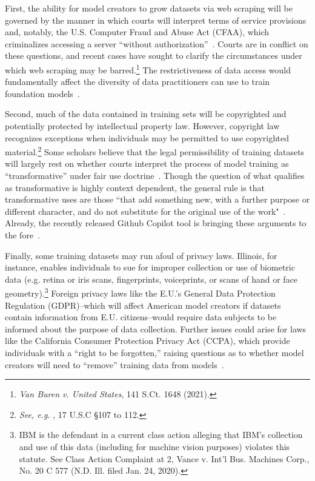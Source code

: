 First, the ability for model creators to grow datasets via web scraping will be governed by the manner in which courts will interpret terms of service provisions and, notably, the U.S.  Computer Fraud and Abuse Act (CFAA), which criminalizes accessing a server ``without authorization''~\citep{cfaa}. Courts are in conflict on these questions, and recent cases have sought to clarify the circumstances under which web scraping may be barred.\footnote{\textit{Van Buren v. United States}, 141 S.Ct. 1648 (2021).} The restrictiveness of data access would fundamentally affect the diversity of data practitioners can use to train foundation models~\citep{levendowski2018copyright}.

Second, much of the data contained in training sets will be copyrighted and potentially protected by intellectual property law. However, copyright law recognizes exceptions when individuals may be permitted to use copyrighted material.\footnote{\textit{See, e.g. }, 17 U.S.C \S 107 to 112.} Some scholars believe that the legal permissibility of training datasets will largely rest on whether courts interpret the process of model training as ``transformative'' under fair use doctrine~\citep{lemley2020fair}. Though the question of what qualifies as transformative is highly context dependent, the general rule is that transformative uses are those ``that add something new, with a further purpose or different character, and do not substitute for the original use of the work"~\citep{usco}. Already, the recently released Github Copilot tool is bringing these arguments to the fore~\citep{verge_copilot}. 

Finally, some training datasets may run afoul of privacy laws. Illinois, for instance, enables individuals to sue for improper collection or use of biometric data (e.g. retina or iris scans, fingerprints, voiceprints, or scans of hand or face geometry).\footnote{IBM is the defendant in a current class action alleging that IBM's collection and use of this data (including for machine vision purposes) violates this statute. See Class Action Complaint at 2, Vance v. Int'l Bus. Machines Corp., No. 20 C 577 (N.D. Ill. filed Jan. 24, 2020).} Foreign privacy laws like the E.U.’s General Data Protection Regulation (GDPR)--which will affect American model creators if datasets contain information from E.U. citizens--would require data subjects to be informed about the purpose of data collection. Further issues could arise for laws like the California Consumer Protection Privacy Act (CCPA), which provide individuals with a ``right to be forgotten,'' raising questions as to whether model creators will need to ``remove'' training data from models~\citep{villaronga2018humans, ginart2019making}. 

